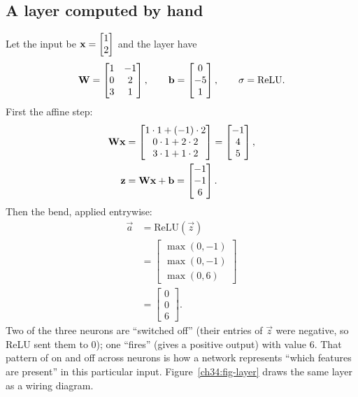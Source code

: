 \subsection{A layer computed by hand}

Let the input be $\mathbf{x}=\begin{bmatrix}1\\2\end{bmatrix}$ and the layer have
\[
\mathbf{W}=\begin{bmatrix} 1 & -1 \\ 0 & 2 \\ 3 & 1 \end{bmatrix},
\qquad
\mathbf{b}=\begin{bmatrix} 0 \\ -5 \\ 1 \end{bmatrix},
\qquad \sigma=\text{ReLU}.
\]
First the affine step:
\begin{align*}
\mathbf{W}\mathbf{x} &= \begin{bmatrix} 1\cdot1+(-1)\cdot2 \\ 0\cdot1+2\cdot2 \\ 3\cdot1+1\cdot2 \end{bmatrix}
= \begin{bmatrix} -1 \\ 4 \\ 5 \end{bmatrix}, \\
\mathbf{z} &= \mathbf{W}\mathbf{x}+\mathbf{b}=\begin{bmatrix} -1 \\ -1 \\ 6 \end{bmatrix}.
\end{align*}
Then the bend, applied entrywise:
\begin{align*}
\vec{a} &= \text{ReLU}(\vec{z}) \\
&= \begin{bmatrix} \max(0,-1) \\ \max(0,-1) \\ \max(0,6) \end{bmatrix} \\
&= \begin{bmatrix} 0 \\ 0 \\ 6 \end{bmatrix}.
\end{align*}
Two of the three neurons are ``switched off'' (their entries of $\vec{z}$ were negative, so
ReLU sent them to $0$); one ``fires'' (gives a positive output) with value $6$. That pattern
of on and off across neurons is how a network represents ``which features are present'' in
this particular input. Figure~\ref{ch34:fig-layer} draws the same layer as a wiring
diagram.

